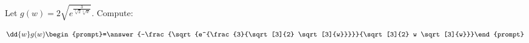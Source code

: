 \documentclass{ximera}
\author{Bart Snapp}
\begin{document}
\begin{exercise}
Let $g(w) = 2 \sqrt{e^{\frac{3}{\sqrt[3]{2} \sqrt[3]{w}}}}$. Compute:

\[
\dd{w}g(w)
\begin{prompt}=\answer{-\frac{\sqrt{e^{\frac{3}{\sqrt[3]{2} \sqrt[3]{w}}}}}{\sqrt[3]{2} w \sqrt[3]{w}}}\end{prompt}
\]
\end{exercise}
\end{document}

